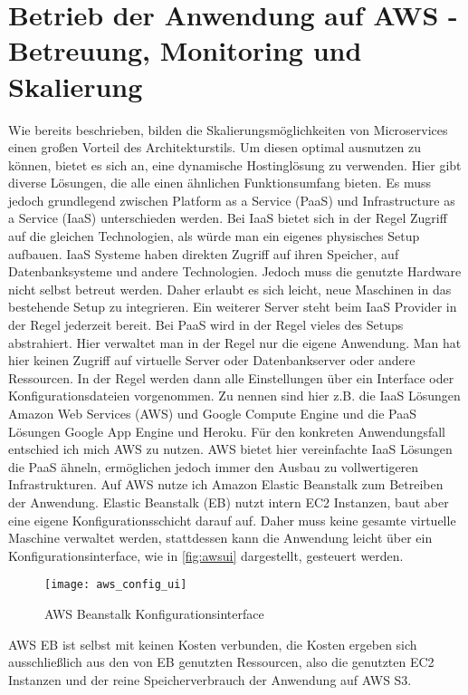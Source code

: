 \section{Betrieb der Anwendung auf AWS - Betreuung, Monitoring und Skalierung}
Wie bereits beschrieben, bilden die Skalierungsmöglichkeiten von Microservices einen großen Vorteil des Architekturstils. Um diesen optimal ausnutzen zu können, bietet es sich an, eine dynamische Hostinglösung zu verwenden. Hier gibt diverse Lösungen, die alle einen ähnlichen Funktionsumfang bieten. Es muss jedoch grundlegend zwischen Platform as a Service (PaaS) und Infrastructure as a Service (IaaS) unterschieden werden. 
Bei IaaS bietet sich in der Regel Zugriff auf die gleichen Technologien, als würde man ein eigenes physisches Setup aufbauen\cite{iaaspaas}. IaaS Systeme haben direkten Zugriff auf ihren Speicher, auf Datenbanksysteme und andere Technologien. Jedoch muss die genutzte Hardware nicht selbst betreut werden. Daher erlaubt es sich leicht, neue Maschinen in das bestehende Setup zu integrieren. Ein weiterer Server steht beim IaaS Provider in der Regel jederzeit bereit.
Bei PaaS wird in der Regel vieles des Setups abstrahiert. Hier verwaltet man in der Regel nur die eigene Anwendung. Man hat hier keinen Zugriff auf virtuelle Server oder Datenbankserver oder andere Ressourcen. In der Regel werden dann alle Einstellungen über ein Interface oder Konfigurationsdateien vorgenommen\cite{heroku:config}.
Zu nennen sind hier z.B. die IaaS Lösungen Amazon Web Services (AWS) und Google Compute Engine\cite{googlecompute} und die PaaS Lösungen Google App Engine\cite{googleapp} und Heroku\cite{heroku}.
Für den konkreten Anwendungsfall entschied ich mich AWS zu nutzen. AWS bietet hier vereinfachte IaaS Lösungen die PaaS ähneln, ermöglichen jedoch immer den Ausbau zu vollwertigeren Infrastrukturen.
Auf AWS nutze ich Amazon Elastic Beanstalk\cite{aws:beanstalk} zum Betreiben der Anwendung. Elastic Beanstalk (EB) nutzt intern EC2 Instanzen, baut aber eine eigene Konfigurationsschicht darauf auf. Daher muss keine gesamte virtuelle Maschine verwaltet werden, stattdessen kann die Anwendung leicht über ein Konfigurationsinterface, wie in \autoref{fig:awsui} dargestellt, gesteuert werden.

\begin{figure}[!ht]
    \centering
    \caption{AWS Beanstalk Konfigurationsinterface}
    \label{fig:awsui}
    \texttt{[image: aws\_config\_ui]}
\end{figure}
AWS EB ist selbst mit keinen Kosten verbunden, die Kosten ergeben sich ausschließlich aus den von EB genutzten Ressourcen, also die genutzten EC2 Instanzen und der reine Speicherverbrauch der Anwendung auf AWS S3. 

